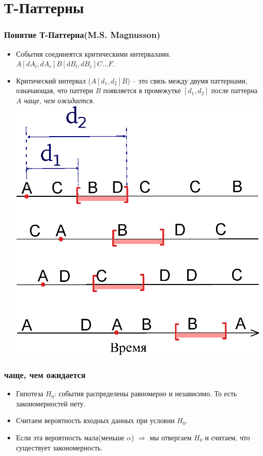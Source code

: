 \documentclass[smaller]{beamer}
\begin{document}
\section{Т-Паттерны}
\begin{frame}	
  \frametitle{Понятие Т-Паттерна(M.S. Magnusson)}
  \begin{itemize}
   \item События соединеятся критическими интервалами. $A[dA_l,dA_r]B[dB_l,dB_r]C\dots F$. 
   \item Критический интервал ($A[d_1,d_2]B$) -- это связь между двумя паттернами, означающая, что паттерн $B$ появляется 
в промежутке $[d_1,d_2]$ 
после паттерна $A$ \emph{чаще, чем ожидается}.
\\ \includegraphics[scale=0.30]{TPTSn.eps} 
  \end{itemize}
\end{frame}

\begin{frame}	
  \frametitle{чаще, чем ожидается}
\begin{itemize}
   \item Гипотеза $H_0$: события распределены равномерно и независимо. То есть закономерностей нету.
   \item Считаем вероятность входных данных при условии $H_0$.
   \item Если эта вероятность мала(меньше $\alpha$) $\Longrightarrow$ мы отвергаем $H_0$ и считаем, что существует закономерность.
\end{itemize}
\end{frame}
\end{document}

